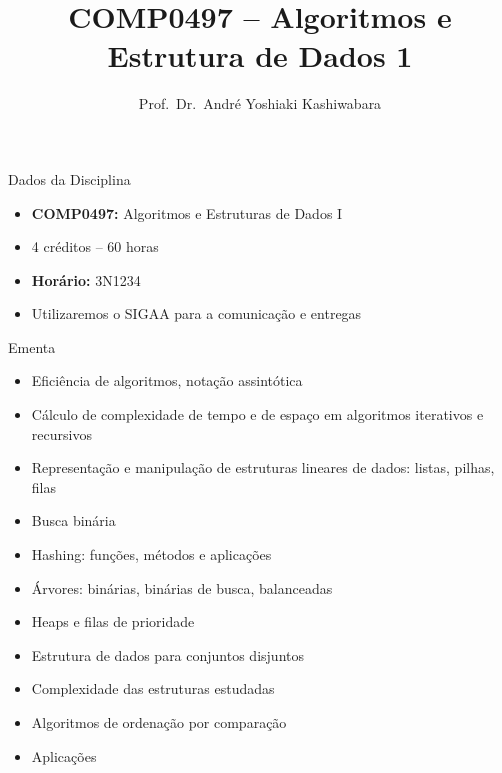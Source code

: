 \documentclass[aspectratio=169]{beamer}
\title{COMP0497 -- Algoritmos e Estrutura de Dados 1}
\author{Prof.\ Dr.\ André Yoshiaki Kashiwabara}
\institute{DCOMP -- Universidade Federal de Sergipe\\
\texttt{andreyoshiaki@dcomp.ufs.br}}
\date{}
\begin{document}
\begin{frame}[plain]
  \titlepage
\end{frame}


\begin{frame}{Dados da Disciplina}
	\begin{itemize}
		\item \textbf{COMP0497:} Algoritmos e Estruturas de Dados I
		\item 4 créditos -- 60 horas
		\item \textbf{Horário:}  3N1234
		\item Utilizaremos o SIGAA para a comunicação e entregas
	\end{itemize}
\end{frame}

\begin{frame}{Ementa}
  \begin{itemize}
    \item Eficiência de algoritmos, notação assintótica
    \item Cálculo de complexidade de tempo e de espaço em algoritmos iterativos e recursivos
    \item Representação e manipulação de estruturas lineares de dados: listas, pilhas, filas
    \item Busca binária
    \item Hashing: funções, métodos e aplicações
    \item Árvores: binárias, binárias de busca, balanceadas
    \item Heaps e filas de prioridade
    \item Estrutura de dados para conjuntos disjuntos
    \item Complexidade das estruturas estudadas
    \item Algoritmos de ordenação por comparação
    \item Aplicações
  \end{itemize}
\end{frame}
\end{document}
